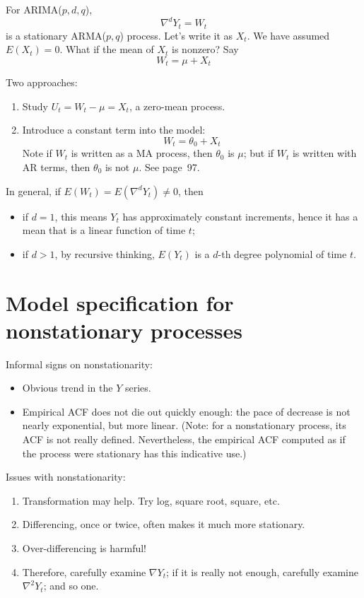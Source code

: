 \documentclass[12pt]{article}
\begin{document}
\begin{enumerate}
For ARIMA($p,d,q$),
\[
\nabla^d Y_t = W_t
\]
is a stationary ARMA($p,q$) process.
Let's write it as $X_t$.
We have assumed $E(X_t) = 0$.
What if the mean of $X_t$ is nonzero?
Say
\[
W_t = \mu + X_t
\]

Two approaches:
\begin{enumerate}
\item Study $U_t = W_t - \mu = X_t$, a zero-mean process.
\item Introduce a constant term into the model:
\[
W_t = \theta_0 + X_t
\]
Note if $W_t$ is written as a MA process, then $\theta_0$ is $\mu$;
but if $W_t$ is written with AR terms, then $\theta_0$ is not $\mu$.
See page~97.
\end{enumerate}

In general, if $E(W_t) = E(\nabla^d Y_t) \ne 0$, then
\begin{itemize}
\item if $d=1$, this means $Y_t$ has approximately constant increments,
    hence it has a mean that is a linear function of time $t$;
\item if $d>1$, by recursive thinking, $E(Y_t)$ is a $d$-th degree
    polynomial of time $t$.
\end{itemize}



\section{Model specification for nonstationary processes}

Informal signs on nonstationarity:
\begin{itemize}
\item Obvious trend in the $Y$ series.
\item Empirical ACF does not die out quickly enough:
    the pace of decrease is not nearly exponential, but more linear.
    (Note: for a nonstationary process, its ACF is not really defined.
    Nevertheless, the empirical ACF computed as if the process were
    stationary has this indicative use.)
\end{itemize}

Issues with nonstationarity:
\begin{enumerate}
\item Transformation may help. Try log, square root, square, etc.
\item Differencing, once or twice, often makes it much more stationary.
\item Over-differencing is harmful!
\item Therefore, carefully examine $\nabla Y_t$;
    if it is really not enough, carefully examine $\nabla^2 Y_t$;
    and so one.
\end{enumerate}


\end{enumerate}
\end{document}
